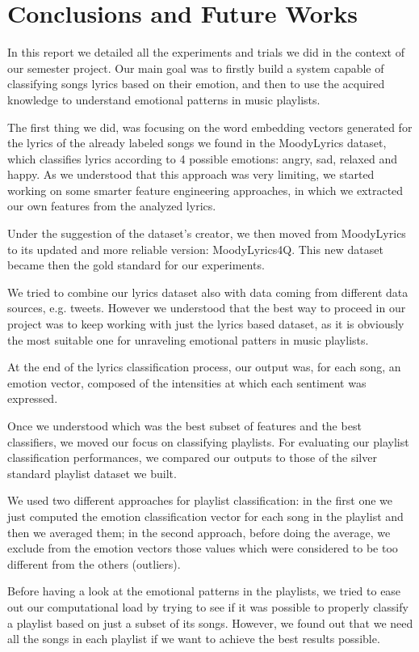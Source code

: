 \chapter{Conclusions and Future Works}

In this report we detailed all the experiments and trials we did in the context
of our semester project. Our main goal was to firstly build a system capable of
classifying songs lyrics based on their emotion, and then to use the acquired knowledge 
to understand emotional patterns in music playlists.

The first thing we did, was focusing on the word embedding vectors generated for the lyrics
of the already labeled songs we found in the MoodyLyrics dataset, which classifies lyrics according to 
4 possible emotions: angry, sad, relaxed and happy. As we understood that this
approach was very limiting, we started working on some smarter feature engineering approaches,
in which we extracted our own features from the analyzed lyrics.

Under the suggestion of the dataset's creator, we then moved from MoodyLyrics to its updated and more
reliable version: MoodyLyrics4Q. This new dataset became then the gold standard for our experiments.

We tried to combine our lyrics dataset also with data coming from different data sources, e.g. tweets. However
we understood that the best way to proceed in our project was to keep working with just the lyrics
based dataset, as it is obviously the most suitable one for unraveling emotional patters in music playlists.

At the end of the lyrics classification process, our output was, for each song, an emotion vector, composed 
of the intensities at which each sentiment was expressed.

Once we understood which was the best subset of features and the best classifiers, we moved our focus on
classifying playlists. For evaluating our playlist classification performances, we compared our outputs
to those of the silver standard playlist dataset we built.

We used two different approaches for playlist classification: in the first one we
just computed the emotion classification vector for each song in the playlist and then we averaged them;
in the second approach, before doing the average, we exclude from the emotion vectors those values which 
were considered to be too different from the others (outliers).

Before having a look at the emotional patterns in the playlists, we tried to ease out our computational
load by trying to see if it was possible to properly classify a playlist based on just a subset of its songs.
However, we found out that we need all the songs in each playlist if we want to achieve the best results possible.

